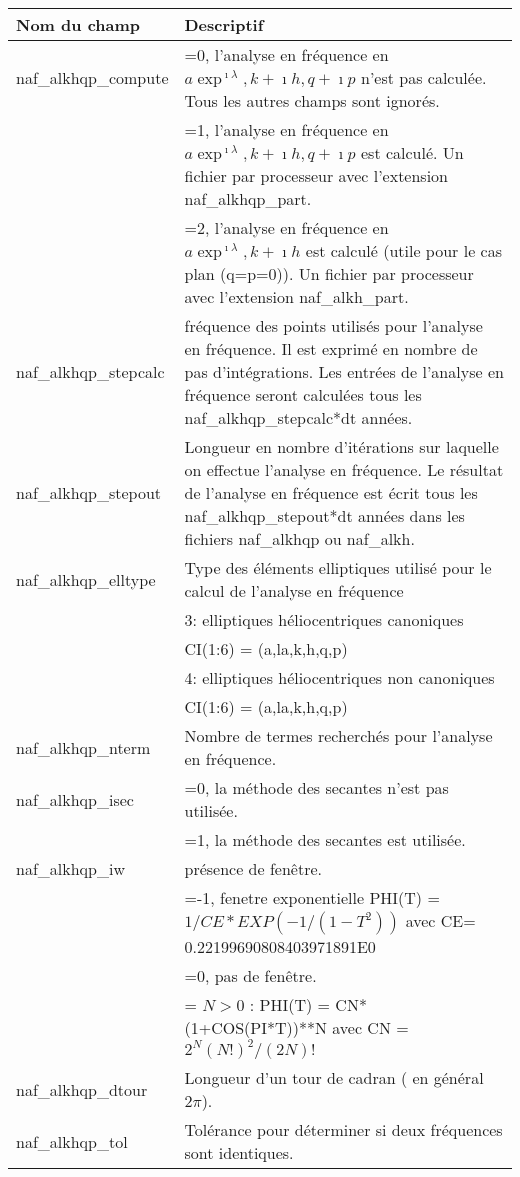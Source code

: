 \documentclass[11pt]{article}
\begin{document}
\begin{tabularx}{\textwidth}{|l|X|}
\hline
Nom du champ& Descriptif \\ \hline \hline
naf\_alkhqp\_compute &  =0, l'analyse en fr\'equence en $a\exp^{\imath\lambda}, k+\imath h, q+\imath p$ n'est pas calcul\'ee. Tous les autres champs sont ignor\'es.\\
&=1, l'analyse en fr\'equence en $a\exp^{\imath\lambda}, k+\imath h, q+\imath p$ est calcul\'e. Un fichier par processeur avec l'extension naf\_alkhqp\_part.\\ 
&=2, l'analyse en fr\'equence en $a\exp^{\imath\lambda}, k+\imath h$ est calcul\'e (utile pour le cas  plan (q=p=0)). Un fichier par processeur avec l'extension naf\_alkh\_part.\\ \hline

naf\_alkhqp\_stepcalc  & fr\'equence des points utilis\'es pour l'analyse en fr\'equence. Il est exprim\'e en nombre de pas d'int\'egrations. Les entr\'ees de l'analyse en fr\'equence seront calcul\'ees tous les naf\_alkhqp\_stepcalc*dt ann\'ees. \\ \hline

naf\_alkhqp\_stepout  & Longueur en nombre d'it\'erations sur laquelle on effectue l'analyse en fr\'equence. Le r\'esultat de l'analyse en fr\'equence est \'ecrit tous les naf\_alkhqp\_stepout*dt ann\'ees dans les fichiers naf\_alkhqp ou naf\_alkh.\\ \hline

naf\_alkhqp\_elltype  & Type des \'el\'ements elliptiques utilis\'e pour le calcul de l'analyse en fr\'equence\\ 
&3:  elliptiques h\'eliocentriques canoniques\\
&	     CI(1:6) = (a,la,k,h,q,p)\\
&4:  elliptiques h\'eliocentriques non canoniques\\
&	     CI(1:6) = (a,la,k,h,q,p)\\ \hline
naf\_alkhqp\_nterm  & Nombre de termes recherch\'es pour l'analyse en fr\'equence.\\ \hline
naf\_alkhqp\_isec  & =0, la m\'ethode des secantes n'est pas utilis\'ee.\\
&=1, la m\'ethode des secantes est utilis\'ee.\\ \hline
naf\_alkhqp\_iw  & pr\'esence de fen\^etre.\\
&=-1, fenetre exponentielle PHI(T) = $1/CE*EXP(-1/(1-T^2))$ avec CE= 0.22199690808403971891E0\\
&=0, pas de fen\^etre.\\
&= $N>0$ : PHI(T) = CN*(1+COS(PI*T))**N avec CN = $2^N(N!)^2/(2N)!$\\ \hline
naf\_alkhqp\_dtour  & Longueur d'un tour de cadran ( en g\'en\'eral $2\pi$).\\ \hline
naf\_alkhqp\_tol  &  Tol\'erance pour d\'eterminer si deux fr\'equences sont identiques.\\ \hline

 \end{tabularx}
\end{document}
